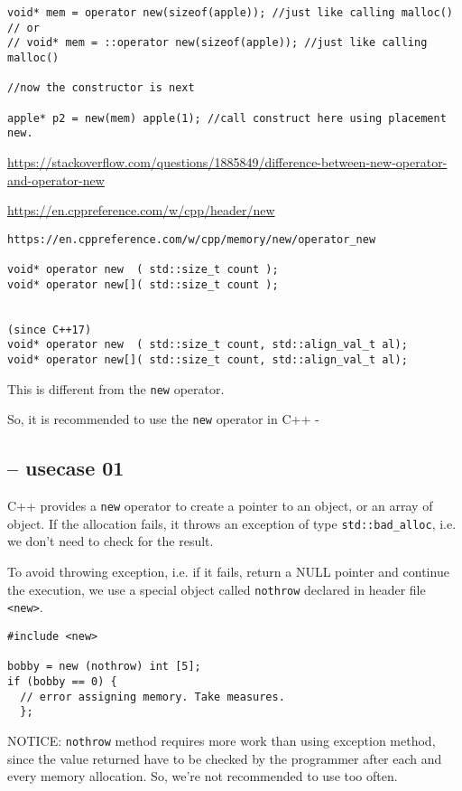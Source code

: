 \begin{verbatim}
void* mem = operator new(sizeof(apple)); //just like calling malloc()
// or
// void* mem = ::operator new(sizeof(apple)); //just like calling malloc()

//now the constructor is next

apple* p2 = new(mem) apple(1); //call construct here using placement new.

 \end{verbatim}

\url{https://stackoverflow.com/questions/1885849/difference-between-new-operator-and-operator-new} 


\url{https://en.cppreference.com/w/cpp/header/new}


\begin{verbatim}
https://en.cppreference.com/w/cpp/memory/new/operator_new

void* operator new  ( std::size_t count );
void* operator new[]( std::size_t count );


(since C++17)
void* operator new  ( std::size_t count, std::align_val_t al);
void* operator new[]( std::size_t count, std::align_val_t al);
\end{verbatim}

This is different from the \verb!new! operator.

So, it is recommended to use the \verb!new! operator in C++ -


\subsection{-- usecase 01}

C++ provides a \verb!new! operator to create a pointer to an
object, or an array of object. If the
allocation fails, it throws an exception of type \verb!std::bad_alloc!, i.e. we
don't need to check for the result.

To avoid throwing exception, i.e. if it fails, return a NULL pointer and
continue the execution, we use a special object called \verb!nothrow! declared
in header file \verb!<new>!. 

\begin{verbatim}
#include <new>

bobby = new (nothrow) int [5]; 
if (bobby == 0) {
  // error assigning memory. Take measures.
  }; 
\end{verbatim}

NOTICE: \verb!nothrow! method requires more work than using exception method,
since the value returned have to be checked by the programmer after each and
every memory allocation. So, we're not recommended to use too often.


